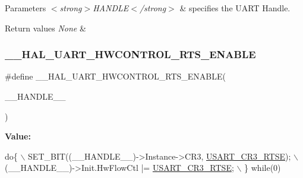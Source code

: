 \begin{DoxyParams}{Parameters}
{\em $<$strong$>$\+H\+A\+N\+D\+L\+E$<$/strong$>$} & specifies the U\+A\+RT Handle. \\
\hline
\end{DoxyParams}

\begin{DoxyRetVals}{Return values}
{\em None} & \\
\hline
\end{DoxyRetVals}
\mbox{\label{group___u_a_r_t___exported___macros_ga017ec9001ff33136f87cc4034b2709a6}} 
\subsubsection{\texorpdfstring{\+\_\+\+\_\+\+H\+A\+L\+\_\+\+U\+A\+R\+T\+\_\+\+H\+W\+C\+O\+N\+T\+R\+O\+L\+\_\+\+R\+T\+S\+\_\+\+E\+N\+A\+B\+LE}{\_\_HAL\_UART\_HWCONTROL\_RTS\_ENABLE}}
{\footnotesize\ttfamily \#define \+\_\+\+\_\+\+H\+A\+L\+\_\+\+U\+A\+R\+T\+\_\+\+H\+W\+C\+O\+N\+T\+R\+O\+L\+\_\+\+R\+T\+S\+\_\+\+E\+N\+A\+B\+LE(\begin{DoxyParamCaption}\item[{}]{\+\_\+\+\_\+\+H\+A\+N\+D\+L\+E\+\_\+\+\_\+ }\end{DoxyParamCaption})}

{\bfseries Value\+:}
\begin{DoxyCode}
\textcolor{keywordflow}{do}\{                                                     \(\backslash\)
    SET\_BIT((\_\_HANDLE\_\_)->Instance->CR3, \hyperlink{group___peripheral___registers___bits___definition_ga7c5d6fcd84a4728cda578a0339b4cac2}{USART\_CR3\_RTSE}); \(\backslash\)
    (\_\_HANDLE\_\_)->Init.HwFlowCtl |= \hyperlink{group___peripheral___registers___bits___definition_ga7c5d6fcd84a4728cda578a0339b4cac2}{USART\_CR3\_RTSE};       \(\backslash\)
  \} \textcolor{keywordflow}{while}(0)
\end{DoxyCode}


